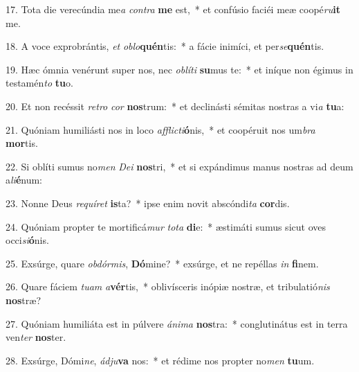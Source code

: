 17. Tota die verecúndia me\textit{a} \textit{con}\textit{tra} \textbf{me} est,~*  et confúsio faciéi meæ coopé\textit{ru}\textbf{it} me.\

18. A voce exprobrántis, \textit{et} \textit{ob}\textit{lo}\textbf{quén}tis:~*  a fácie inimíci, et per\textit{se}\textbf{quén}tis.\

19. Hæc ómnia venérunt super nos, nec \textit{ob}\textit{lí}\textit{ti} \textbf{su}mus te:~*  et iníque non égimus in testamén\textit{to} \textbf{tu}o.\

20. Et non recéssit \textit{re}\textit{tro} \textit{cor} \textbf{nos}trum:~*  et declinásti sémitas nostras a vi\textit{a} \textbf{tu}a:\

21. Quóniam humiliásti nos in loco \textit{af}\textit{flic}\textit{ti}\textbf{ó}nis,~*  et coopéruit nos um\textit{bra} \textbf{mor}tis.\

22. Si oblíti sumus no\textit{men} \textit{De}\textit{i} \textbf{nos}tri,~*  et si expándimus manus nostras ad deum a\textit{li}\textbf{é}num:\

23. Nonne Deus \textit{re}\textit{quí}\textit{ret} \textbf{is}ta?~*  ipse enim novit abscóndi\textit{ta} \textbf{cor}dis.\

24. Quóniam propter te mortificá\textit{mur} \textit{to}\textit{ta} \textbf{di}e:~*  æstimáti sumus sicut oves occi\textit{si}\textbf{ó}nis.\

25. Exsúrge, quare \textit{ob}\textit{dór}\textit{mis}, \textbf{Dó}mine?~*  exsúrge, et ne repéllas \textit{in} \textbf{fi}nem.\

26. Quare fáciem \textit{tu}\textit{am} \textit{a}\textbf{vér}tis,~*  oblivísceris inópiæ nostræ, et tribulatió\textit{nis} \textbf{nos}træ?\

27. Quóniam humiliáta est in púlvere \textit{á}\textit{ni}\textit{ma} \textbf{nos}tra:~*  conglutinátus est in terra ven\textit{ter} \textbf{nos}ter.\

28. Exsúrge, Dómi\textit{ne}, \textit{ád}\textit{ju}\textbf{va} nos:~*  et rédime nos propter no\textit{men} \textbf{tu}um.\

